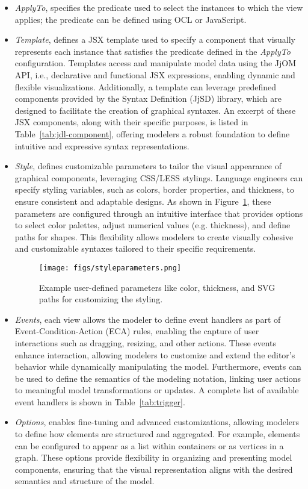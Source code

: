 \begin{itemize}
    \item \textit{ApplyTo}, specifies the predicate used to select the instances to which the view applies; the predicate can be defined using OCL or JavaScript.  
    \item \textit{Template}, defines a JSX template used to specify a component that visually represents each instance that satisfies the predicate defined in the \textit{ApplyTo} configuration. Templates access and manipulate model data using the JjOM API, i.e., declarative and functional JSX expressions, enabling dynamic and flexible visualizations. Additionally, a template can leverage predefined components provided by the \jjodel{} Syntax Definition (JjSD) library, which are designed to facilitate the creation of graphical syntaxes. An excerpt of these JSX components, along with their specific purposes, is listed in Table~\ref{tab:jdl-component}, offering modelers a robust foundation to define intuitive and expressive syntax representations.
    \item \textit{Style}, defines customizable parameters to tailor the visual appearance of graphical components, leveraging CSS/LESS stylings. Language engineers can specify styling variables, such as colors, border properties, and thickness, to ensure consistent and adaptable designs. As shown in Figure~\ref{fig:style-editor}, these parameters are configured through an intuitive interface that provides options to select color palettes, adjust numerical values (e.g. thickness), and define paths for shapes. This flexibility allows modelers to create visually cohesive and customizable syntaxes tailored to their specific requirements.
    \begin{figure}[ht]
    \centering
    \texttt{[image: figs/styleparameters.png]} %
    \caption{Example user-defined parameters like color, thickness, and SVG paths for customizing the styling.}
    \label{fig:style-editor}
    \end{figure} 
    \item \textit{Events}, each view allows the modeler to define event handlers as part of Event-Condition-Action (ECA) rules, enabling the capture of user interactions such as dragging, resizing, and other actions. These events enhance interaction, allowing modelers to customize and extend the editor’s behavior while dynamically manipulating the model. Furthermore, events can be used to define the semantics of the modeling notation, linking user actions to meaningful model transformations or updates. A complete list of available event handlers is shown in Table~\ref{tab:trigger}.
    \item \textit{Options}, enables fine-tuning and advanced customizations, allowing modelers to define how elements are structured and aggregated. For example, elements can be configured to appear as a list within containers or as vertices in a graph. These options provide flexibility in organizing and presenting model components, ensuring that the visual representation aligns with the desired semantics and structure of the model.
\end{itemize}  


